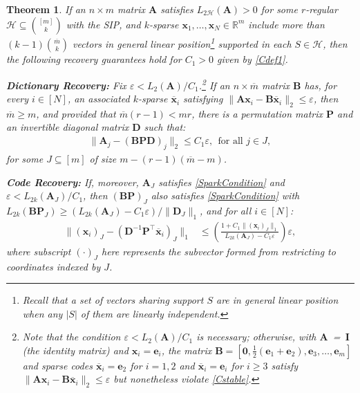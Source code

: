 \documentclass[journal, twocolumn]{IEEEtran}
\newtheorem{theorem}{Theorem}
\begin{document}
\begin{theorem}\label{DeterministicUniquenessTheorem}
If an $n \times m$ matrix $\mathbf{A}$ satisfies $L_{2\mathcal{H}}(\mathbf{A}) > 0$ for some $r$-regular $\mathcal{H} \subseteq {[m] \choose k}$ with the SIP, and $k$-sparse \mbox{$\mathbf{x}_1, \ldots, \mathbf{x}_N \in \mathbb{R}^m$} include more than $(k-1){\overline m \choose k}$ vectors in general linear position\footnote{Recall that a set of vectors sharing support $S$ are in \emph{general linear position} when any $|S|$ of them are linearly independent.} supported in each $S \in \mathcal{H}$, then the following recovery guarantees hold for $C_1 > 0$ given by \eqref{Cdef1}.

\textbf{Dictionary Recovery:} Fix $\varepsilon < L_{2}(\mathbf{A}) / C_1$.\footnote{Note that the condition $\varepsilon < L_2(\mathbf{A}) /C_1$ is necessary; otherwise, with \mbox{$\mathbf{A}$ = $\mathbf{I}$} (the identity matrix) and $\mathbf{x}_i = \mathbf{e}_i$, the matrix $\mathbf{B} = \left[\mathbf{0}, \frac{1}{2}(\mathbf{e}_1 + \mathbf{e}_2), \mathbf{e}_3, \ldots, \mathbf{e}_{m} \right]$ and sparse codes $\mathbf{\overline x}_i = \mathbf{e}_2$ for $i = 1, 2$ and $\mathbf{\overline x}_i = \mathbf{e}_i$ for $i \geq 3$ satisfy $\|\mathbf{A}\mathbf{x}_i - \mathbf{B}\mathbf{\overline x}_i \|_2 \leq \varepsilon$ but nonetheless violate \eqref{Cstable}.} If an $n \times \overline m$ matrix $\mathbf{B}$ has, for every $i \in [N]$, an associated $k$-sparse $\mathbf{\overline x}_i$ satisfying \mbox{$\|\mathbf{A}\mathbf{x}_i - \mathbf{B}\mathbf{\overline x}_i\|_2 \leq \varepsilon$}, then $\overline m \geq m$, and provided that $\overline m (r-1) < mr$, there is a permutation matrix $\mathbf{P}$ and an invertible diagonal matrix $\mathbf{D}$ such that:
\begin{align}\label{Cstable}
\|\mathbf{A}_j- (\mathbf{BPD})_j\|_2 \leq C_1 \varepsilon, \ \ \text{for all } j \in J,
\end{align}
%
for some $J \subseteq [m]$ of size \mbox{$m - (r-1)(\overline m - m)$}. 

\textbf{Code Recovery:} If, moreover, $\mathbf{A}_J$ satisfies \eqref{SparkCondition} and $\varepsilon < L_{2k}(\mathbf{A}_J) / C_1$, then $(\mathbf{BP})_J$ also satisfies \eqref{SparkCondition} with $L_{2k}(\mathbf{BP}_J) \geq (L_{2k}(\mathbf{A}_J) - C_1 \varepsilon) / \|\mathbf{D}_J\|_1$, and for all $i \in [N]$:
\begin{align}\label{b-PDa}
\|(\mathbf{x}_i)_J - (\mathbf{D}^{-1}\mathbf{P}^{\top} \mathbf{\overline x}_i)_J\|_1 &\leq  \left( \frac{ 1+C_1 \|(\mathbf{x}_i)_J\|_1 }{ L_{2k}(\mathbf{A}_J) -  C_1\varepsilon } \right) \varepsilon,
\end{align}
%
where subscript $(\cdot)_J$ here represents the subvector formed from restricting to coordinates indexed by $J$.
\end{theorem}
\end{document}
